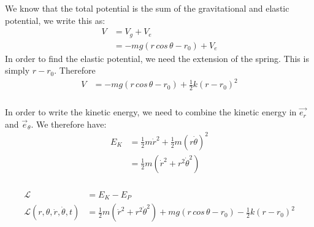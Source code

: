 \documentclass{article}
\begin{document}
\subsubsection{} %

We know that the total potential is the sum of the gravitational and elastic potential, we write this as:
\begin{align*}
	V &= V_g + V_e\\
	&=  -mg(r\,cos\,\theta - r_0) + V_e
\end{align*}
In order to find the elastic potential, we need the extension of the spring. This is simply $r - r_0$. Therefore
\begin{align*}
	V &=  -mg(r\,cos\,\theta - r_0) + \frac{1}{2}k(r-r_0)^2
\end{align*}

\subsubsection{} %

In order to write the kinetic energy, we need to combine the kinetic energy in $\vec{e_r}$ and $\vec{e}_{\theta}$. We therefore have:
\begin{align*}
	E_K &= \frac{1}{2}m\dot{r}^2 + \frac{1}{2}m(r\dot{\theta})^2\\
	&= \frac{1}{2}m(\dot{r}^2 + r^2\dot{\theta}^2)
\end{align*}

\subsubsection{} %

\begin{align*}
	\mathcal{L} &= E_{K} - E_P\\
	\mathcal{L}(r,\theta,\dot{r},\dot{\theta},t) &= \frac{1}{2}m(\dot{r}^2 + r^2\dot{\theta}^2) + mg(r\,cos\,\theta - r_0) - \frac{1}{2}k(r-r_0)^2
\end{align*}

\subsubsection{} %
\end{document}
